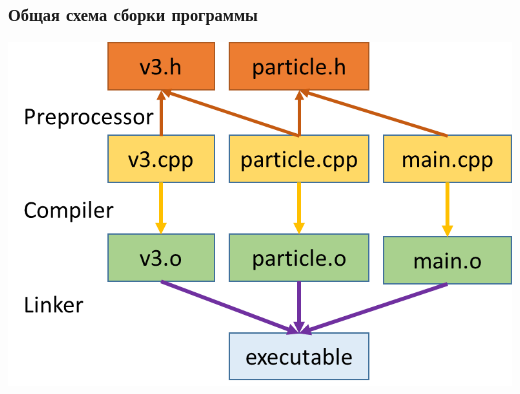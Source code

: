 \documentclass[10pt]{beamer}
\begin{document}
\begin{frame}[fragile]
\frametitle{Общая схема сборки программы} 
\begin{center}
\includegraphics[width=0.95\linewidth]{images/separate_compilation_linking.png}
\end{center}
\end{frame}
\end{document}
